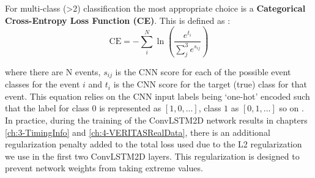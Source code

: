 For multi-class (>2) classification the most appropriate choice is a \textbf{Categorical Cross-Entropy Loss Function (CE)}. This is defined \cite{Keras} as :
\begin{equation}
    \textrm{CE}=-\sum_i^N \ln \left( \frac{e^{t_{i}}}{\sum_j^3 e^{s_{ij}}} \right)
\end{equation}

where there are N events, $s_{ij}$  is the CNN score for each of the possible event classes for the event $i$ and $t_{i}$ is the CNN score for the target (true) class for that event. This equation relies on the CNN input labels being `one-hot' encoded such that the label for class $0$ is represented as $[1,0,...]$, class $1$ as $[0,1,...]$ so on \cite{fb}. In practice, during the training of the ConvLSTM2D network results in chapters \ref{ch:3-TimingInfo} and \ref{ch:4-VERITASRealData}, there is an additional regularization penalty added to the total loss used due to the L2 regularization we use in the first two ConvLSTM2D layers. This regularization is designed to prevent network weights from taking extreme values.

\begin{table}[ht]
    \centering
    \caption{Definitions of Event Classifications for binary classification, taken from \cite{fawcett}.}
    \label{table:FPR}
\end{table}

